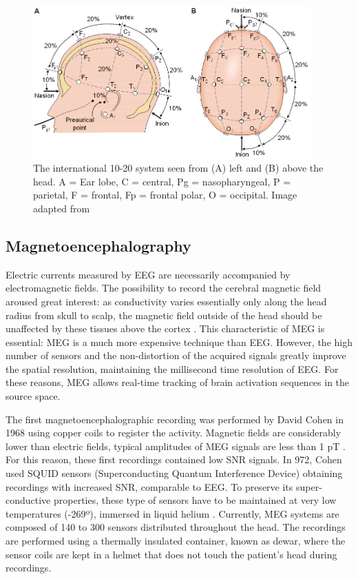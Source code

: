 \begin{figure}[ht]
\centering
\includegraphics[width=0.95\textwidth]{Images/1020EEGsystem1.png}
\caption{The international 10-20 system seen from (A) left and (B) above the head. A  = Ear lobe, C  = central, Pg = nasopharyngeal, P  = parietal, F  = frontal, Fp = frontal polar, O  = occipital. Image adapted from \citet{American1991}}
\label{fig:1020EEG}
\end{figure}
          \subsection{Magnetoencephalography}

Electric currents measured by EEG are necessarily accompanied by electromagnetic fields. The possibility to record the cerebral magnetic field aroused great interest: as conductivity varies essentially only along the head radius from skull to scalp, the magnetic field outside of the head should be unaffected by these tissues above the cortex \citep{Hari2012}. This characteristic of MEG is essential: MEG is a much more expensive technique than EEG. However, the high number of sensors and the non-distortion of the acquired signals greatly improve the spatial resolution, maintaining the millisecond time resolution of EEG. For these reasons, MEG allows real-time tracking of brain activation sequences in the source space. 

The first magnetoencephalographic recording was performed by David Cohen in 1968 \citep{Cohen1968} using copper coils to register the activity. Magnetic fields are considerably lower than electric fields, typical amplitudes of MEG signals are less than 1 pT \citep{Lee2014}. For this reason, these first recordings contained low SNR signals. In 972, Cohen used SQUID sensors (Superconducting Quantum Interference Device) obtaining recordings with increased SNR, comparable to EEG. To preserve its super-conductive properties, these type of sensors have to be maintained at very low temperatures (-269º), immersed in liquid helium \citep{Hari2012}. Currently, MEG systems are composed of 140 to 300 sensors distributed throughout the head. The recordings are performed using a thermally insulated container, known as dewar, where the sensor coils are kept in a helmet that does not touch the patient's head during recordings. 

